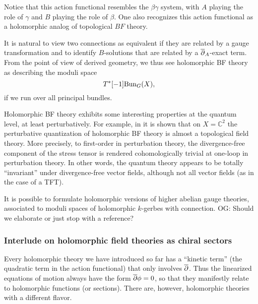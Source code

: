 \documentclass[11pt]{amsart}
\def\C{{\mathbb{C}}}
\def\owen#1{{\textcolor{violet!50!black}{OG: {#1}}}}
\begin{document}
\begin{rmk}
Notice that this action functional resembles the $\beta\gamma$ system, 
with $A$ playing the role of $\gamma$ and $B$ playing the role of $\beta$.
One also recognizes this action functional as a holomorphic analog of topological $BF$ theory. 
\end{rmk}

It is natural to view two connections as equivalent if they are related by a gauge transformation
and to identify $B$-solutions that are related by a ${\overline{\partial}}_A$-exact term.
From the point of view of derived geometry,
we thus see holomorphic BF theory as describing the moduli space
\[
T^*[-1] {\rm Bun}_G(X),
\]
if we run over all principal bundles.

\begin{rmk}
Holomorphic BF theory exhibits some interesting properties at the quantum level,
at least perturbatively.
For example, in \cite[\S3.2]{semichiral} it is shown that on $X = \C^2$ 
the perturbative quantization of holomorphic BF theory is almost a topological field theory. 
More precisely, to first-order in perturbation theory, 
the divergence-free component of the stress tensor is rendered cohomologically trivial at one-loop in perturbation theory.
In other words, the quantum theory appears to be totally ``invariant'' under divergence-free vector fields,
although not all vector fields (as in the case of a TFT).
\end{rmk}

It is possible to formulate holomorphic versions of higher abelian gauge theories,
associated to moduli spaces of holomorphic $k$-gerbes with connection.
\owen{Should we elaborate or just stop with a reference?}

\subsubsection{Interlude on holomorphic field theories as chiral sectors}

Every holomorphic theory we have introduced so far has a ``kinetic term'' (the quadratic term in the action functional) that only involves ${\overline{\partial}}$.
Thus the linearized equations of motion always have the form ${\overline{\partial}} \phi = 0$,
so that they manifestly relate to holomorphic functions (or sections).
There are, however, holomorphic theories with a different flavor.

\begin{comment}
A typical scalar field theory is the free boson which exists on any Riemannian manifold $\Sigma$.
Its action functional is simply $\int_\Sigma \phi \triangle \phi$ where $\phi$ is a smooth function on $\Sigma$.
We saved this example for last since its holomorphic analog is a bit more elusive than the previous examples.
\end{comment}
\end{document}
